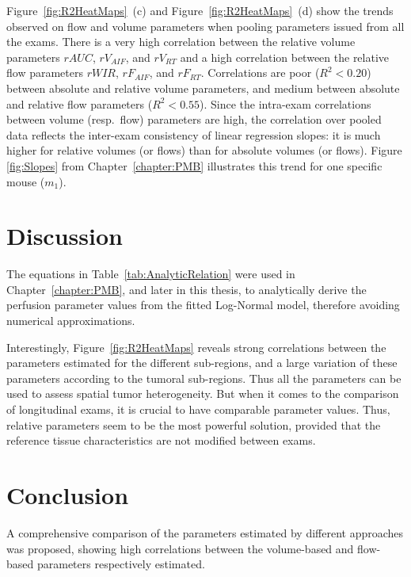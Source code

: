 Figure~\ref{fig:R2HeatMaps}~(c) and Figure~\ref{fig:R2HeatMaps}~(d) show the trends observed on flow and volume parameters when pooling parameters issued from all the exams. There is a very high correlation between the relative volume parameters $rAUC$, $rV_{AIF}$, and $rV_{RT}$ and a high correlation between the relative flow parameters $rWIR$, $rF_{AIF}$, and $rF_{RT}$. Correlations are poor ($R^2 < 0.20$) between absolute and relative volume parameters, and medium between absolute and relative flow parameters ($R^2< 0.55$). Since the intra-exam correlations between volume (resp.~flow) parameters are high, the correlation over pooled data reflects the inter-exam consistency of linear regression slopes: it is much higher for relative volumes (or flows) than for absolute volumes (or flows). Figure \ref{fig:Slopes} from Chapter~\ref{chapter:PMB} illustrates this trend for one specific mouse ($m_1$). 

\section{Discussion}
The equations in Table~\ref{tab:AnalyticRelation} were used in Chapter~\ref{chapter:PMB}, and later in this thesis, to analytically derive the perfusion parameter values from the fitted Log-Normal model, therefore avoiding numerical approximations.

Interestingly, Figure~\ref{fig:R2HeatMaps} reveals strong correlations between the parameters estimated for the different sub-regions, and a large variation of these parameters according to the tumoral sub-regions. Thus all the parameters can be used to assess spatial tumor heterogeneity. But when it comes to the comparison of longitudinal exams, it is crucial to have comparable parameter values. Thus, relative parameters seem to be the most powerful solution, provided that the reference tissue characteristics are not modified between exams.

\section{Conclusion}
A comprehensive comparison of the parameters estimated by different approaches was proposed, showing high correlations between the volume-based and flow-based parameters respectively estimated.